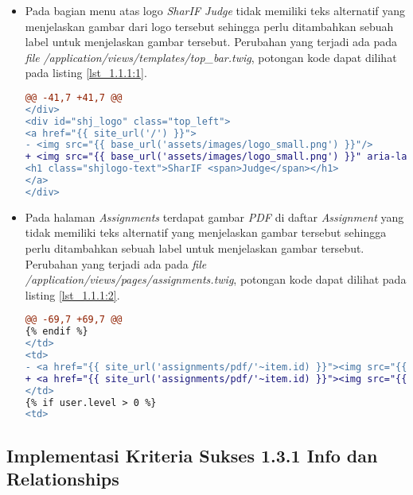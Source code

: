 \begin{itemize}
	\item Pada bagian menu atas logo \textit{SharIF Judge} tidak memiliki teks alternatif yang menjelaskan gambar dari logo tersebut sehingga perlu ditambahkan sebuah label untuk menjelaskan gambar tersebut. Perubahan yang terjadi ada pada \textit{file} \textit{/application/views/templates/top\_bar.twig}, potongan kode dapat dilihat pada listing \ref{lst_1.1.1:1}.
	
\begin{lstlisting}[language=diff, caption=Perubahan pada \textit{file} \textit{top\_bar.twig}, label=lst_1.1.1:1, basicstyle=\ttfamily, frame=single,
columns=fullflexible, keepspaces=true, breaklines=true]
@@ -41,7 +41,7 @@
</div>
<div id="shj_logo" class="top_left">
<a href="{{ site_url('/') }}">
- <img src="{{ base_url('assets/images/logo_small.png') }}"/>
+ <img src="{{ base_url('assets/images/logo_small.png') }}" aria-label="Logo SharIF Judge"/>
<h1 class="shjlogo-text">SharIF <span>Judge</span></h1>
</a>
</div>
\end{lstlisting}

	\item Pada halaman \textit{Assignments} terdapat gambar \textit{PDF} di daftar \textit{Assignment} yang tidak memiliki teks alternatif yang menjelaskan gambar tersebut sehingga perlu ditambahkan sebuah label untuk menjelaskan gambar tersebut. Perubahan yang terjadi ada pada \textit{file} \textit{/application/views/pages/assignments.twig}, potongan kode dapat dilihat pada listing \ref{lst_1.1.1:2}.
	
\begin{lstlisting}[language=diff, caption=Perubahan pada \textit{file} \textit{assignments.twig}, label=lst_1.1.1:2, basicstyle=\ttfamily, frame=single,
columns=fullflexible, keepspaces=true, breaklines=true]
@@ -69,7 +69,7 @@
{% endif %}
</td>
<td>
- <a href="{{ site_url('assignments/pdf/'~item.id) }}"><img src="{{ base_url('assets/images/pdf.svg') }}" /></a>
+ <a href="{{ site_url('assignments/pdf/'~item.id) }}"><img src="{{ base_url('assets/images/pdf.svg') }}" aria-label="Download PDF For Assignment {{ item.name }}"/></a>
</td>
{% if user.level > 0 %}
<td>
\end{lstlisting}
\end{itemize}

\subsection{Implementasi Kriteria Sukses 1.3.1 Info dan Relationships}
\label{subsec:implementasi_A_1.3.1}

